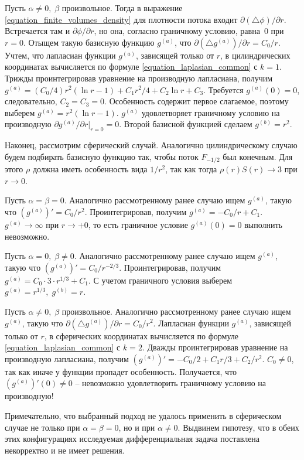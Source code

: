 \documentclass[a4paper,12pt]{article}
\theoremstyle{plain}
\theoremstyle{definition}
\begin{document}
Пусть $\alpha \neq 0, \; \beta$ произвольное. Тогда в выражение \eqref{equation_finite_volumes_density} для плотности потока входит $\partial (\triangle \phi) / \partial r$. Встречается там и $\partial \phi / \partial r$, но она, согласно граничному условию, равна~$0$ при $r = 0$. Отыщем такую базисную функцию $g^{(a)}$, что $\partial (\triangle g^{(a)}) / \partial r = C_0 / r$. Учтем, что лапласиан функции $g^{(a)}$, зависящей только от $r$, в цилиндрических координатах вычисляется по формуле \eqref{equation_laplasian_common} с $k = 1$. Трижды проинтегрировав уравнение на производную лапласиана, получим $g^{(a)} = (C_0/4) r^2 (\ln r - 1) + C_1 r^2 / 4 + C_2 \ln r + C_3$. Требуется $g^{(a)}(0) = 0$, следовательно, $C_2 = C_3 = 0$. Особенность содержит первое слагаемое, поэтому выберем $g^{(a)} = r^2 (\ln r - 1)$. $g^{(a)}$ удовлетворяет граничному условию на производную $\partial g^{(a)} / \partial r|_{r = 0} = 0$. Второй базисной функцией сделаем $g^{(b)} = r^2$.

Наконец, рассмотрим сферический случай. Аналогично цилиндрическому случаю будем подбирать базисную функцию так, чтобы поток $F_{-1/2}$ был конечным. Для этого $\rho$ должна иметь особенность вида $1/r^2$, так как тогда $\rho(r) S(r) \to 3$ при $r \to 0$.

Пусть $\alpha = \beta = 0$. Аналогично рассмотренному ранее случаю ищем $g^{(a)}$, такую что $(g^{(a)})' = C_0 / r^2$. Проинтегрировав, получим $g^{(a)} = -C_0 / r + C_1$. $g^{(a)} \to \infty$ при $r \to +0$, то есть граничное условие $g^{(a)}(0) = 0$ выполнить невозможно.

Пусть $\alpha = 0, \; \beta \neq 0$. Аналогично рассмотренному ранее случаю ищем $g^{(a)}$, такую что $(g^{(a)})' = C_0 / r^{-2/3}$. Проинтегрировав, получим $g^{(a)} = C_0 \cdot 3 \cdot r^{1/3} + C_1$. С учетом граничного условия выберем $g^{(a)} = r^{1/3}, \; g^{(b)} = r$.

Пусть $\alpha \neq 0, \; \beta$ произвольное. Аналогично рассмотренному ранее случаю ищем $g^{(a)}$, такую что $\partial (\triangle g^{(a)}) / \partial r = C_0 / r^2$. Лапласиан функции $g^{(a)}$, зависящей только от $r$, в сферических координатах вычисляется по формуле \eqref{equation_laplasian_common} с $k = 2$. Дважды проинтегрировав уравнение на производную лапласиана, получим $(g^{(a)})' = -C_0 / 2 + C_1 r / 3 + C_2 / r^2$. $C_0 \neq 0$, так как иначе у функции пропадет особенность. Получается, что $(g^{(a)})'(0) \neq 0$ -- невозможно удовлетворить граничному условию на производную!

Примечательно, что выбранный подход не удалось применить в сферическом случае не только при $\alpha = \beta = 0$, но и при $\alpha \neq 0$. Выдвинем гипотезу, что в обеих этих конфигурациях исследуемая дифференциальная задача поставлена некорректно и не имеет решения.
\end{document}
